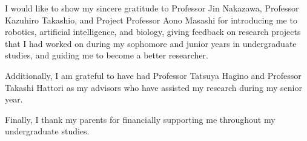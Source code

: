 \documentclass[12pt]{report}
\begin{document}
  \titlepage
  \comemberspage
  \firstabstract

  \toc
  \newpage
  \listoffigures


  \newpage
  
  
  
  
  
  
  
  


  \acknowledgements
  I would like to show my sincere gratitude to Professor Jin Nakazawa, Professor Kazuhiro Takashio, and Project Professor Aono Masashi for introducing me to robotics, artificial intelligence, and biology, giving feedback on research projects that I had worked on during my sophomore and junior years in undergraduate studies, and guiding me to become a better researcher.

  Additionally, I am grateful to have had Professor Tatsuya Hagino and Professor Takashi Hattori as my advisors who have assisted my research during my senior year.

  Finally, I thank my parents for financially supporting me throughout my undergraduate studies.


  \newpage
  \nocite{*}


  
  

  \appendix
  
  
  \newpage
  
  \newpage
  
\end{document}
